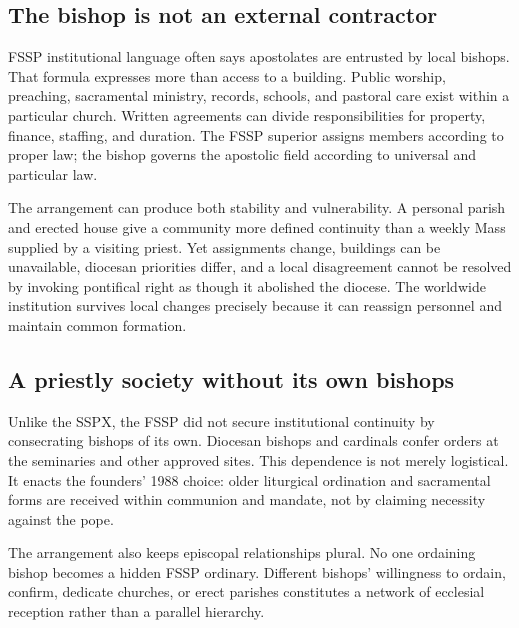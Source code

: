 \subsection{The bishop is not an external contractor}

FSSP institutional language often says apostolates are entrusted by local bishops. That formula expresses more than access to a building. Public worship, preaching, sacramental ministry, records, schools, and pastoral care exist within a particular church. Written agreements can divide responsibilities for property, finance, staffing, and duration. The FSSP superior assigns members according to proper law; the bishop governs the apostolic field according to universal and particular law.

The arrangement can produce both stability and vulnerability. A personal parish and erected house give a community more defined continuity than a weekly Mass supplied by a visiting priest. Yet assignments change, buildings can be unavailable, diocesan priorities differ, and a local disagreement cannot be resolved by invoking pontifical right as though it abolished the diocese. The worldwide institution survives local changes precisely because it can reassign personnel and maintain common formation.

\subsection{A priestly society without its own bishops}

Unlike the SSPX, the FSSP did not secure institutional continuity by consecrating bishops of its own. Diocesan bishops and cardinals confer orders at the seminaries and other approved sites. This dependence is not merely logistical. It enacts the founders' 1988 choice: older liturgical ordination and sacramental forms are received within communion and mandate, not by claiming necessity against the pope.

The arrangement also keeps episcopal relationships plural. No one ordaining bishop becomes a hidden FSSP ordinary. Different bishops' willingness to ordain, confirm, dedicate churches, or erect parishes constitutes a network of ecclesial reception rather than a parallel hierarchy.

